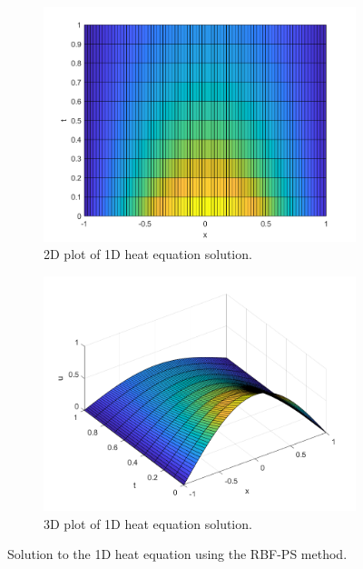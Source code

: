 \begin{solution}
    \begin{figure}[h]
        \centering
        \begin{subfigure}{0.45\textwidth}
            \centering
            \includegraphics[width=\textwidth]{problem_3i_heat_2d.png}
            \caption{2D plot of 1D heat equation solution.}
            \label{fig:problem_3i_heat_2d}
        \end{subfigure}
        \begin{subfigure}{0.45\textwidth}
            \centering
            \includegraphics[width=\textwidth]{problem_3i_heat_3d.png}
            \caption{3D plot of 1D heat equation solution.}
            \label{fig:problem_3i_heat_3d}
        \end{subfigure}
        \caption{Solution to the 1D heat equation using the RBF-PS method.}
        \label{fig:problem_3i_heat}
    \end{figure}


\end{solution}
